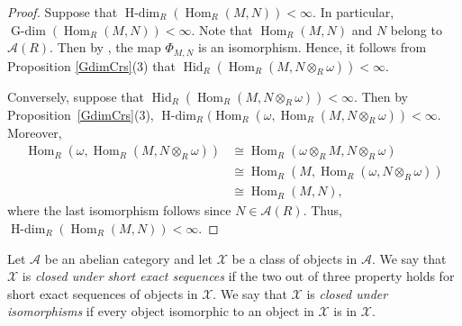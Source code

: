 \documentclass[11pt, a4paper,pagebackref]{amsart}
\numberwithin{equation}{section}
\theoremstyle{definition}
\newtheorem{remark and definition}[theorem]{Remark and Definition}
\newtheorem{remark and notation}[theorem]{Remark and Notation}
\newcommand\Hom{\operatorname{Hom}}
\begin{document}
\begin{proof}
   Suppose that $\operatorname{H-dim}_R(\Hom_R(M,N))<\infty$. In particular, $\operatorname{G-dim}(\Hom_R(M,N))<\infty$. Note that  $\Hom_R(M, N)$ and $N$ belong to $\mathcal{A}(R)$. Then by \cite[Lemma 5.1]{AuslanderReitenCinjetivadimensionVanishingofExt}, the map $\Phi_{M,N}$ is an isomorphism. Hence,  it follows from Proposition \ref{GdimCrs}(3) that $\operatorname{Hid}_R(\Hom_R(M, N \otimes_R \omega))<\infty$. 

   Conversely,  suppose that $\operatorname{Hid}_R(\Hom_R(M, N \otimes_R  
 \omega))<\infty$. Then by Proposition~\ref{GdimCrs}(3), \linebreak 
 $ \operatorname{H-dim}_R(\Hom_R(\omega, \Hom_R(M, N \otimes_R \omega))<\infty$. 
   Moreover, 
   \begin{align*}
       \Hom_R( \omega, \Hom_R(M,N \otimes_R \omega))&\cong \Hom_R(\omega \otimes_R M, N \otimes_R \omega)\\ &\cong \Hom_R(M, \Hom_R(\omega, N \otimes_R  \omega))\\& \cong \Hom_R(M, N), 
   \end{align*}
   where the last isomorphism follows since $N \in \mathcal{A}(R).$ Thus, $\operatorname{H-dim}_R(\Hom_R(M,N))<\infty$. 
\end{proof}

Let $\mathcal{A}$ be an abelian category and let $\mathcal{X}$ be a class of objects in $\mathcal{A}$. We say that $\mathcal{X}$ is \textit{closed under short exact sequences} if 
the two out of three property
holds for short exact sequences of objects in $\mathcal{X}$. We say that $\mathcal{X}$ is \textit{closed under isomorphisms} if every object isomorphic to an object in $\mathcal{X}$ is in $\mathcal{X}$.  
\end{document}
